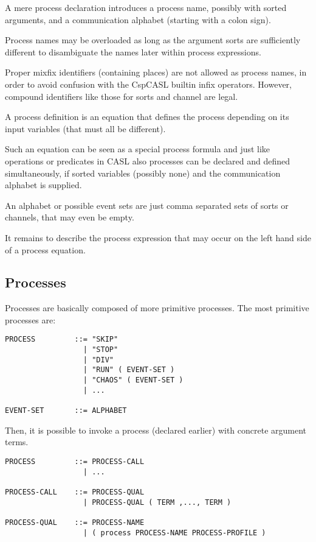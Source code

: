 \documentclass{article}
\begin{document}
A mere process declaration introduces a process name, possibly with sorted
arguments, and a communication alphabet (starting with a colon sign).

Process names may be overloaded as long as the argument sorts are sufficiently
different to disambiguate the names later within process expressions.

Proper mixfix identifiers (containing places) are not allowed as process
names, in order to avoid confusion with the CspCASL builtin infix operators.
However, compound identifiers like those for sorts and channel are legal.

A process definition is an equation that defines the process depending on its
input variables (that must all be different).

Such an equation can be seen as a special process formula and just like
operations or predicates in CASL also processes can be declared and defined
simultaneously, if sorted variables (possibly none) and the communication
alphabet is supplied.

An alphabet or possible event sets are just comma separated sets of sorts or
channels, that may even be empty.

It remains to describe the process expression that may occur on the left hand
side of a process equation.

\subsection{Processes}

Processes are basically composed of more primitive processes. The most
primitive processes are:

\begin{verbatim}
PROCESS         ::= "SKIP"
                  | "STOP"
                  | "DIV"
                  | "RUN" ( EVENT-SET )
                  | "CHAOS" ( EVENT-SET )
                  | ...

EVENT-SET       ::= ALPHABET
\end{verbatim}

Then, it is possible to invoke a process (declared earlier) with concrete
argument terms.

\begin{verbatim}
PROCESS         ::= PROCESS-CALL
                  | ...

PROCESS-CALL    ::= PROCESS-QUAL
                  | PROCESS-QUAL ( TERM ,..., TERM )

PROCESS-QUAL    ::= PROCESS-NAME
                  | ( process PROCESS-NAME PROCESS-PROFILE )
\end{verbatim}
\end{document}
